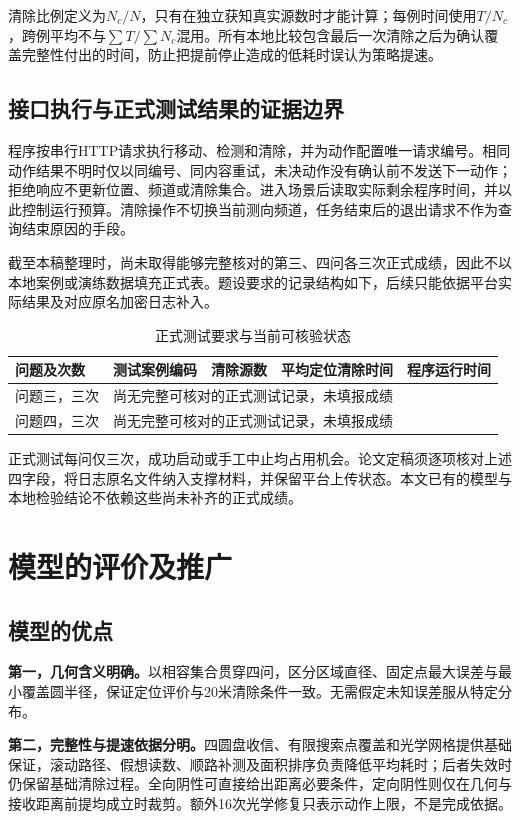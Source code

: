 \documentclass{JXUSTmodeling}
\begin{document}
清除比例定义为$N_c/N$，只有在独立获知真实源数时才能计算；每例时间使用$T/N_c$，跨例平均不与$\sum T/\sum N_c$混用。所有本地比较包含最后一次清除之后为确认覆盖完整性付出的时间，防止把提前停止造成的低耗时误认为策略提速。

\subsection{接口执行与正式测试结果的证据边界}
程序按串行HTTP请求执行移动、检测和清除，并为动作配置唯一请求编号。相同动作结果不明时仅以同编号、同内容重试，未决动作没有确认前不发送下一动作；拒绝响应不更新位置、频道或清除集合。进入场景后读取实际剩余程序时间，并以此控制运行预算。清除操作不切换当前测向频道，任务结束后的退出请求不作为查询结束原因的手段。

截至本稿整理时，尚未取得能够完整核对的第三、四问各三次正式成绩，因此不以本地案例或演练数据填充正式表。题设要求的记录结构如下，后续只能依据平台实际结果及对应原名加密日志补入。
\begin{table}[htbp]
\centering\small
\caption{正式测试要求与当前可核验状态}
\begin{tabularx}{\textwidth}{lXXXX}
\toprule
问题及次数 & 测试案例编码 & 清除源数 & 平均定位清除时间 & 程序运行时间\\
\midrule
问题三，三次 & \multicolumn{4}{l}{尚无完整可核对的正式测试记录，未填报成绩}\\
问题四，三次 & \multicolumn{4}{l}{尚无完整可核对的正式测试记录，未填报成绩}\\
\bottomrule
\end{tabularx}
\end{table}
正式测试每问仅三次，成功启动或手工中止均占用机会。论文定稿须逐项核对上述四字段，将日志原名文件纳入支撑材料，并保留平台上传状态。本文已有的模型与本地检验结论不依赖这些尚未补齐的正式成绩。

\section{模型的评价及推广}\label{sec:7}
\subsection{模型的优点}
\textbf{第一，几何含义明确。}以相容集合贯穿四问，区分区域直径、固定点最大误差与最小覆盖圆半径，保证定位评价与20米清除条件一致。无需假定未知误差服从特定分布。

\textbf{第二，完整性与提速依据分明。}四圆盘收信、有限搜索点覆盖和光学网格提供基础保证，滚动路径、假想读数、顺路补测及面积排序负责降低平均耗时；后者失效时仍保留基础清除过程。全向阴性可直接给出距离必要条件，定向阴性则仅在几何与接收距离前提均成立时裁剪。额外16次光学修复只表示动作上限，不是完成依据。
\end{document}
